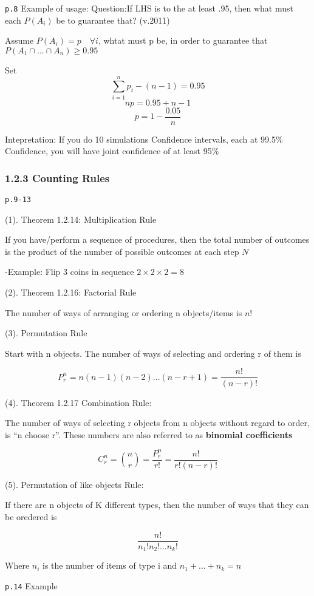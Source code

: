 \documentclass[]{tufte-book}
\begin{document}
\texttt{p.8} Example of usage: Question:If LHS is to the at least .95,
then what must each \(P(A_i)\) be to guarantee that? (v.2011)

Assume \(P(A_i)=p \quad \forall i\), whtat must p be, in order to
guarantee that \(P(A_1\cap ...\cap A_n)\ge 0.95\)

Set \[\sum_{i=1}^np_i-(n-1)=0.95\] \[np=0.95+n-1\] \[p=1-\frac{0.05}n\]

Intepretation: If you do 10 simulations Confidence intervals, each at
99.5\% Confidence, you will have joint confidence of at least 95\%

\hypertarget{counting-rules}{%
\subsubsection{1.2.3 Counting Rules}\label{counting-rules}}

\texttt{p.9-13}

(1). Theorem 1.2.14: Multiplication Rule

If you have/perform a sequence of procedures, then the total number of
outcomes is the product of the number of possible outcomes at each step
\(N\)

-Example: Flip 3 coins in sequence \(2\times2\times2=8\)

(2). Theorem 1.2.16: Factorial Rule

The number of ways of arranging or ordering n objects/items is \(n!\)

(3). Permutation Rule

Start with n objects. The number of ways of selecting and ordering r of
them is

\[P_r^n=n(n-1)(n-2)...(n-r+1)=\frac{n!}{(n-r)!}\]

(4). Theorem 1.2.17 Combination Rule:

The number of ways of selecting r objects from n objects without regard
to order, is ``n choose r''. These numbers are also referred to as
\textbf{binomial coefficients}

\[C_r^n=\binom nr=\frac{P_r^n}{r!}=\frac{n!}{r!(n-r)!}\]

(5). Permutation of like objects Rule:

If there are n objects of K different types, then the number of ways
that they can be oredered is

\[\frac{n!}{n_1!n_2!...n_k!}\]

Where \(n_i\) is the number of items of type i and \(n_1+...+n_k=n\)

\texttt{p.14} Example
\end{document}
